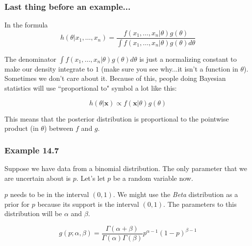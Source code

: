 \documentclass{beamer}
\begin{document}
\begin{frame}
\frametitle{Last thing before an example...}

In the formula
\[
h(\theta| x_1, \ldots, x_n) = \frac{f(x_1, \ldots, x_n | \theta) g(\theta)  }{ \int f(x_1, \ldots, x_n | \theta) g(\theta) d \theta }
\]

The denominator $\int f(x_1, \ldots, x_n | \theta) g(\theta) d \theta$ is just a normalizing constant to make our density integrate to $1$ (make sure you see why...it isn't a function in $\theta$). Sometimes we don't care about it. Because of this, people doing Bayesian statistics will use ``proportional to" symbol a lot like this:

\[
h(\theta|\mathbf{x}) \propto f(\mathbf{x}|\theta) g(\theta)
\] 

This means that the posterior distribution is proportional to the pointwise product (in $\theta$) between $f$ and $g$.

\end{frame}
\begin{frame}
\frametitle{Example 14.7}

Suppose we have data from a binomial distribution. The only parameter that we are uncertain about is $p$. Let's let $p$ be a random variable now.
\newline

$p$ needs to be in the interval $(0,1)$. We might use the \emph{Beta} distribution as a prior for $p$ because its support is the interval $(0,1)$. The parameters to this distribution will be $\alpha$ and $\beta$.

\[
g(p ; \alpha, \beta) = \frac{\Gamma(\alpha + \beta)}{\Gamma(\alpha) \Gamma(\beta)} p^{\alpha-1}(1-p)^{\beta-1}
\]

\end{frame}
\end{document}
